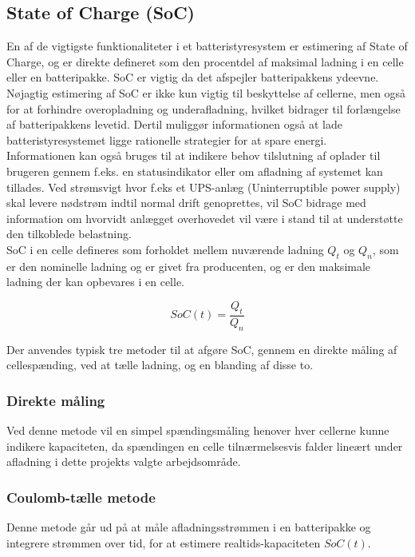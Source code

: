 \subsection{State of Charge (SoC)}
En af de vigtigste funktionaliteter i et batteristyresystem er estimering af State of Charge, og er direkte defineret som den procentdel af maksimal ladning i en celle eller en batteripakke. SoC er vigtig da det afspejler batteripakkens ydeevne. Nøjagtig estimering af SoC er ikke kun vigtig til beskyttelse af cellerne, men også for at forhindre overopladning og underafladning, hvilket bidrager til forlængelse af batteripakkens levetid. Dertil muliggør informationen også at lade batteristyresystemet ligge rationelle strategier for at spare energi.
\\
Informationen kan også bruges til at indikere behov tilslutning af oplader til brugeren gennem f.eks. en statusindikator eller om afladning af systemet kan tillades. 
Ved strømsvigt hvor f.eks et UPS-anlæg (Uninterruptible power supply) skal levere nødstrøm indtil normal drift genoprettes, vil SoC bidrage med information om hvorvidt anlægget overhovedet vil være i stand til at understøtte den tilkoblede belastning.
\\

SoC i en celle defineres som forholdet mellem nuværende ladning $Q_{t}$ og $Q_{n}$, som er den nominelle ladning og er givet fra producenten, og er den maksimale ladning der kan opbevares i en celle.

\begin {equation} 
SoC(t) = \frac{Q_t}{Q_n} \label{eq:soc}
\end {equation}

Der anvendes typisk tre metoder til at afgøre SoC, gennem en direkte måling af cellespænding, ved at tælle ladning, og en blanding af disse to.

\subsubsection{Direkte måling}
Ved denne metode vil en simpel spændingsmåling henover hver cellerne kunne indikere kapaciteten, da spændingen en celle tilnærmelsesvis falder lineært under afladning i dette projekts valgte arbejdsområde.

\subsubsection{Coulomb-tælle metode}
Denne metode går ud på at måle afladningsstrømmen i en batteripakke og integrere strømmen over tid, for at estimere realtids-kapaciteten $SoC(t)$. 


